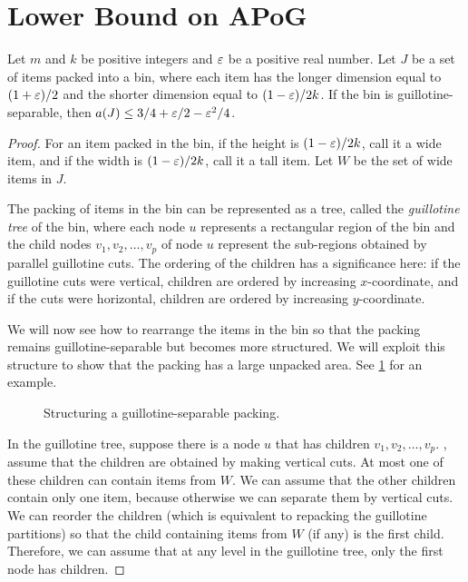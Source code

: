 \section{Lower Bound on APoG}
\label{sec:apog-lb}

\begin{lemma}
\label{thm:guill-hardex-area}
Let $m$ and $k$ be positive integers and $\varepsilon$ be a positive real number.
Let $J$ be a set of items packed into a bin, where each item has the longer dimension
equal to $(1+\varepsilon)/2$ and the shorter dimension equal to $(1-\varepsilon)/2k$.
If the bin is guillotine-separable, then $a(J) \le 3/4 + \varepsilon/2 - \varepsilon^2/4$.
\end{lemma}
\begin{proof}
For an item packed in the bin, if the height is $(1-\varepsilon)/2k$, call it a wide item,
and if the width is $(1-\varepsilon)/2k$, call it a tall item.
Let $W$ be the set of wide items in $J$.

The packing of items in the bin can be represented as a tree,
called the \emph{guillotine tree} of the bin,
where each node $u$ represents a rectangular region of the bin
and the child nodes $v_1, v_2, \ldots, v_p$ of node $u$
represent the sub-regions obtained by parallel guillotine cuts.
The ordering of the children has a significance here:
if the guillotine cuts were vertical, children are ordered by increasing $x$-coordinate,
and if the cuts were horizontal, children are ordered by increasing $y$-coordinate.

We will now see how to rearrange the items in the bin so that the packing remains
guillotine-separable but becomes more structured.
We will exploit this structure to show that the packing has a large unpacked area.
See \cref{fig:shift-thin} for an example.

\begin{figure}[htb]
\centering

\caption{Structuring a guillotine-separable packing.}
\label{fig:shift-thin}
\end{figure}

In the guillotine tree, suppose there is a node $u$
that has children $v_1, v_2, \ldots, v_p$.
\WLoG, assume that the children are obtained by making vertical cuts.
At most one of these children can contain items from $W$.
We can assume \wLoG{} that the other children contain only one item,
because otherwise we can separate them by vertical cuts.
We can reorder the children (which is equivalent to repacking the guillotine partitions)
so that the child containing items from $W$ (if any) is the first child.
Therefore, we can assume \wLoG{} that at any level in the guillotine tree,
only the first node has children.


\end{proof}
